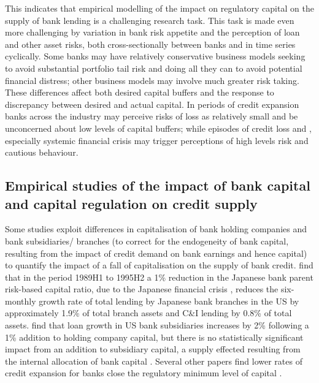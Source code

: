\documentclass[
]{article}
\begin{document}
This indicates that empirical modelling of the impact on regulatory capital on the supply of bank lending is a challenging research task. This task is made even more challenging by variation in bank risk appetite and the perception of loan and other asset risks, both cross-sectionally between banks and in time series cyclically. Some banks may have relatively conservative business models seeking to avoid substantial portfolio tail risk and doing all they can to avoid potential financial distress; other business models may involve much greater risk taking. These differences affect both desired capital buffers and the response to discrepancy between desired and actual capital. In periods of credit expansion banks across the industry may perceive risks of loss as relatively small and be unconcerned about low levels of capital buffers; while episodes of credit loss and , especially systemic financial crisis may trigger perceptions of high levels risk and cautious behaviour.

\hypertarget{empirical-studies-of-the-impact-of-bank-capital-and-capital-regulation-on-credit-supply}{%
\subsection{Empirical studies of the impact of bank capital and capital regulation on credit supply}\label{empirical-studies-of-the-impact-of-bank-capital-and-capital-regulation-on-credit-supply}}

Some studies exploit differences in capitalisation of bank holding companies and bank subsidiaries/ branches (to correct for the endogeneity of bank capital, resulting from the impact of credit demand on bank earnings and hence capital) to quantify the impact of a fall of capitalisation on the supply of bank credit. \citet{peek1997international} find that in the period 1989H1 to 1995H2 a 1\% reduction in the Japanese bank parent risk-based capital ratio, due to the Japanese financial crisis , reduces the six-monthly growth rate of total lending by Japanese bank branches in the US by approximately 1.9\% of total branch assets and C\&I lending by 0.8\% of total assets. \citet{houston1997capital} find that loan growth in US bank subsidiaries increases by 2\% following a 1\% addition to holding company capital, but there is no statistically significant impact from an addition to subsidiary capital, a supply effected resulting from the internal allocation of bank capital \citep[see,][ on losses in the 1930s]{calomiris2003fundamentals, calomiris1998bank}. Several other papers find lower rates of credit expansion for banks close the regulatory minimum level of capital \citep[see,][]{hancock1994bank, berger1994lines, nier2005bank, van2008welfare, gambacorta2004does, berrospide2010effects}.
\end{document}

